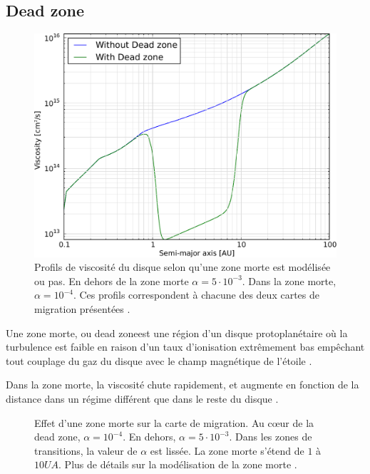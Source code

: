 \subsection{Dead zone}
\begin{figure}[htbp]
\centering
\includegraphics[width=0.6\linewidth]{figure/migration_map/viscosity/dead_zone_profile.pdf}
\caption[Effet d'une zone morte sur la viscosité.]{Profils de viscosité du disque selon qu'une zone morte est modélisée ou pas.
En dehors de la zone morte $\alpha=5\cdot 10^{-3}$. Dans la zone morte, $\alpha=10^{-4}$. Ces profils correspondent à chacune
des deux cartes de migration
présentées \protect{}. }\label{fig:dead_zone_profile}
\end{figure}

Une zone morte, ou \og dead zone\fg est une région d'un disque protoplanétaire où la turbulence est faible en raison d'un taux
d'ionisation extrêmement bas empêchant tout couplage du gaz du disque avec le champ magnétique de l'étoile
.

Dans la zone morte, la viscosité chute rapidement, et augmente en fonction de la distance dans un régime différent que dans le reste du disque . 

\begin{figure}[htbp]
\centering
{}\hfill
{}

\caption[Effet d'une zone morte sur la carte de migration.]{Effet d'une zone morte sur la carte de migration. Au cœur de la dead
zone, $\alpha=10^{-4}$. En dehors, $\alpha=5\cdot 10^{-3}$. Dans les zones de transitions, la valeur de $\alpha$ est lissée. La
zone morte s'étend de $1$ à $10\unit{UA}$. Plus de détails sur la modélisation de la zone morte \protect{}.
}\label{fig:viscosity_DZ}
\end{figure}

